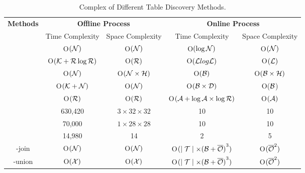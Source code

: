     \begin{table*}[t]
	\centering
	\caption{Complex of Different Table Discovery Methods.}  \vspace{-1em}
	{
		\begin{tabular}{c||cc|cc}
			\toprule
			\multirow{2}{1cm}{\textbf{Methods}} & \multicolumn{2}{c}{\textbf{Offline Process}} & \multicolumn{2}{c}{\textbf{Online Process}} \\ 
			&Time Complexity    & Space Complexity & Time Complexity & Space Complexity \\ 
			\midrule[1pt]     %
			
			\starmie         & O$(\mathcal{N})$         & O$(\mathcal{N})$                   & O$(\log \mathcal{N})$                & O$(\mathcal{N})$    \\
			\josie             & O$(\mathcal{K} + \mathcal{R} \log \mathcal{R})$         & O$(\mathcal{R})$                   & O$(\mathcal{L} log \mathcal{L})$         & O$(\mathcal{L})$        \\         
			\lsh          & O$(\mathcal{N})$        & O$(\mathcal{N} \times \mathcal{H})$                   & O$(\mathcal{B})$                & O$(\mathcal{B} \times \mathcal{H})$     \\
			\dlll          & O$(\mathcal{K} + \mathcal{N})$          & O$(\mathcal{N})$                   & O$(\mathcal{B} \times \mathcal{D})$                & O($\mathcal{B}$)       \\
			\pex          & O$(\mathcal{R})$        & O$(\mathcal{R})$                   & O$(\mathcal{A} + \log \mathcal{A} \times \log \mathcal{R})$                & O$(\mathcal{A})$      \\
			\deepjoin             & 630,420        & $3\times32\times32$    & 10               & 10      \\
			\tus          & 70,000         & $1\times28\times28$    & 10               & 10          \\
			\santos              & 14,980         & 14                   & 2                & 5     \\
			\frt-join         &  O$(\mathcal{N})$        & O$(\mathcal{N})$    & O$( \mid \mathcal{T} \mid \times {(\mathcal{B}+ \overline{\mathcal{O}})}^3)$               & O$({\overline{\mathcal{O}}}^2)$       \\
			\frt-union         & O$(\mathcal{X})$         & O$(\mathcal{X})$    & O$(\mid \mathcal{T} \mid \times {(\mathcal{B}+ \overline{\mathcal{O}})}^3)$               & O$({\overline{\mathcal{O}}}^2)$       \\

\end{tabular}}
\end{table*}
